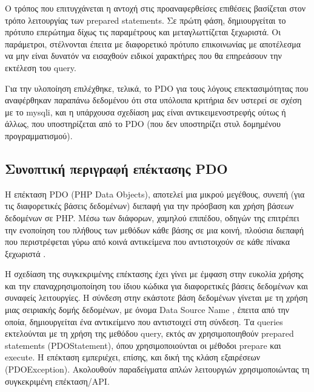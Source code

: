 \documentclass[diploma]{softlab-thesis}
\begin{document}
\bigskip

Ο τρόπος που επιτυγχάνεται η αντοχή στις προαναφερθείσες επιθέσεις βασίζεται
στον τρόπο λειτουργίας των prepared statements. Σε πρώτη φάση, δημιουργείται το
πρότυπο επερώτημα δίχως τις παραμέτρους και μεταγλωττίζεται ξεχωριστά. Οι
παράμετροι, στέλνονται έπειτα με διαφορετικό πρότυπο επικοινωνίας με
αποτέλεσμα να μην είναι δυνατόν να εισαχθούν ειδικοί χαρακτήρες που θα
επηρεάσουν την εκτέλεση του query.

\bigskip

Για την υλοποίηση επιλέχθηκε, τελικά, το PDO για τους λόγους επεκτασιμότητας
που αναφέρθηκαν παραπάνω δεδομένου ότι στα υπόλοιπα κριτήρια δεν υστερεί σε
σχέση με το mysqli, και η υπάρχουσα σχεδίαση μας είναι αντικειμενοστρεφής ούτως
ή άλλως, που υποστηρίζεται από το PDO (που δεν υποστηρίζει στυλ δομημένου
προγραμματισμού).

\subsection{Συνοπτική περιγραφή επέκτασης PDO}

Η επέκταση PDO (PHP Data Objects), αποτελεί μια μικρού μεγέθους, συνεπή (για
τις διαφορετικές βάσεις δεδομένων) διεπαφή για την πρόσβαση και χρήση βάσεων
δεδομένων σε PHP. Μέσω των διάφορων, χαμηλού επιπέδου, οδηγών της επιτρέπει την
ενοποίηση του πλήθους των μεθόδων κάθε βάσης σε μια κοινή, πλούσια διεπαφή που
περιστρέφεται γύρω από κοινά αντικείμενα που αντιστοιχούν σε κάθε πίνακα ξεχωριστά
\cite{pdo}.

\bigskip

Η σχεδίαση της συγκεκριμένης επέκτασης έχει γίνει με έμφαση στην ευκολία χρήσης
και την επαναχρησιμοποίηση του ίδιου κώδικα για διαφορετικές βάσεις δεδομένων
και συναφείς λειτουργίες. Η σύνδεση στην εκάστοτε βάση δεδομένων γίνεται με τη
χρήση μιας σειριακής δομής δεδομένων, με όνομα Data Source Name \cite{dsn},
έπειτα από την οποία, δημιουργείται ένα αντικείμενο που αντιστοιχεί στη
σύνδεση. Τα queries εκτελούνται με τη χρήση της μεθόδου query, εκτός αν
χρησιμοποιηθούν prepared statements (PDOStatement), όπου χρησιμοποιούνται οι
μέθοδοι prepare και execute. Η επέκταση εμπεριέχει, επίσης, και δική της κλάση
εξαιρέσεων (PDOException). Ακολουθούν παραδείγματα απλών λειτουργιών
χρησιμοποιώντας τη συγκεκριμένη επέκταση/API.

\bigskip

\FloatBarrier


\end{document}
